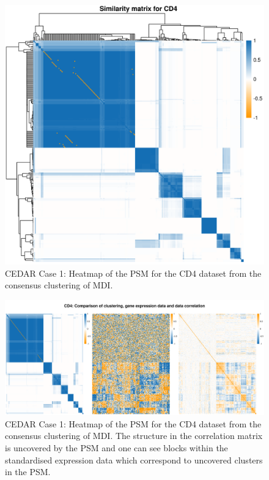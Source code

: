 \documentclass[14pt]{extarticle} %
\begin{document}
	
	\begin{figure}[h]
		\centering
		\includegraphics[scale=0.75]{Images/Biology_data/Set_250/All_datasets/Similarity_matrices/similarity_matrix_CD4.png}
		\caption{CEDAR Case 1: Heatmap of the PSM for the CD4 dataset from the consensus clustering of MDI.}
		\label{fig:results:cedar_1:mdi_cd4_psm}
	\end{figure}
	
	\newpage
	
	\begin{figure}
		\centering
		\includegraphics[scale=0.5]{Images/Biology_data/Set_250/All_datasets/Comparison_expression_clustering_correlation/CD4.png}
		\caption{CEDAR Case 1: Heatmap of the PSM for the CD4 dataset from the consensus clustering of MDI. The structure in the correlation matrix is uncovered by the PSM and one can see blocks within the standardised expression data which correspond to uncovered clusters in the PSM.}
		\label{fig:results:cedar_1:mdi_cd4_psm_expr_cor}
	\end{figure}
\end{document}
